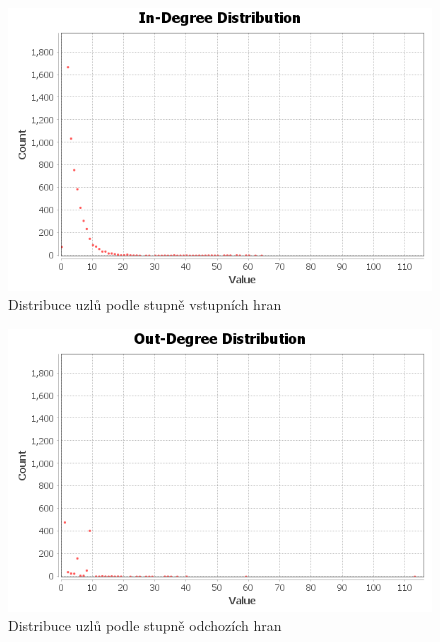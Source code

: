\documentclass[A4]{article}
\begin{document}
\begin{figure}
    \centering
    \includegraphics[width=1\textwidth]{degree-report/indegree-distribution.png}
    \caption{Distribuce uzlů podle stupně vstupních hran}
    \label{distribution:in-degree}
\end{figure}

\begin{figure}
    \centering
    \includegraphics[width=1\textwidth]{degree-report/outdegree-distribution.png}
    \caption{Distribuce uzlů podle stupně odchozích hran}
    \label{distribution:out-degree}
\end{figure}
\end{document}

